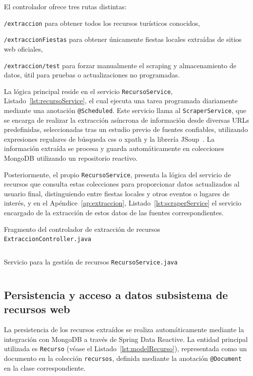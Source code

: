 El controlador ofrece tres rutas distintas:

\texttt{/extraccion} para obtener todos los recursos turísticos conocidos,

\texttt{/extraccionFiestas} para obtener únicamente fiestas locales extraídas de sitios web oficiales,

\texttt{/extraccion/test} para forzar manualmente el scraping y almacenamiento de datos, útil para pruebas o actualizaciones no programadas.

La lógica principal reside en el servicio \texttt{RecursoService}, Listado~\ref{lst:recursoService}, el cual ejecuta una tarea programada diariamente mediante una anotación \texttt{@Scheduled}. Este servicio llama al \texttt{ScraperService}, que se encarga de realizar la extracción asíncrona de información desde diversas URLs predefinidas, seleccionadas tras un estudio previo de fuentes confiables, utilizando expresiones regulares de búsqueda \gls{css} o \gls{xpath} y la librería JSoup~\cite{jsoup}. La información extraída se procesa y guarda automáticamente en colecciones MongoDB\cite{mongodb} utilizando un repositorio reactivo.

Posteriormente, el propio \texttt{RecursoService}, presenta la lógica del servicio de recursos que consulta estas colecciones para proporcionar datos actualizados al usuario final, distinguiendo entre fiestas locales y otros eventos o lugares de interés, y en el Apéndice~\ref{ap:extraccion}, Listado~\ref{lst:scraperService} el servicio encargado de la extracción de estos datos de las fuentes correspondientes.

\begin{longlisting} \caption{Fragmento del controlador de extracción de recursos {\tt ExtraccionController.java}} \inputminted[firstline=15]{java}{../backend/extraccion/extraccion/src/main/java/es/uv/hemal/extraccion/extraccion/endpoints/ExtraccionController.java} \label{lst:extraccionController} \end{longlisting}

\begin{longlisting} \caption{Servicio para la gestión de recursos {\tt RecursoService.java}} \inputminted[firstline=13]{java}{../backend/extraccion/extraccion/src/main/java/es/uv/hemal/extraccion/extraccion/services/RecursoService.java} \label{lst:recursoService} \end{longlisting}

\subsection{Persistencia y acceso a datos subsistema de recursos web}
La persistencia de los recursos extraídos se realiza automáticamente mediante la integración con MongoDB a través de Spring Data Reactive. La entidad principal utilizada es \texttt{Recurso} (véase el Listado~\ref{lst:modelRecurso}), representada como un documento en la colección \texttt{recursos}, definida mediante la anotación \texttt{@Document} en la clase correspondiente.

